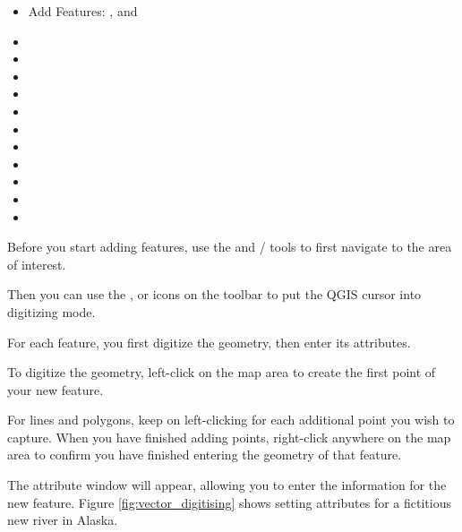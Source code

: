 \begin{itemize}
\item Add Features: ,
   and
\item {}
\item {}
\item {}
\item {}
\item {}
\item {}
\item {}
\item {}
\item {}
\item {}
\item {}
\end{itemize}


Before you start adding features, use the 
and / tools to first navigate to the area of interest.

Then you can use the ,
 or
 icons on the toolbar to put the QGIS cursor
into digitizing mode.

For each feature, you first digitize the geometry, then enter its attributes.

To digitize the geometry, left-click on the map area to create the
first point of your new feature.

For lines and polygons, keep on left-clicking for each additional
point you wish to capture.  When you have finished adding points,
right-click anywhere on the map area to confirm you have finished entering
the geometry of that feature.

The attribute window will appear, allowing you to enter the information for the new feature.
Figure \ref{fig:vector_digitising} shows setting attributes for a fictitious
new river in Alaska.

